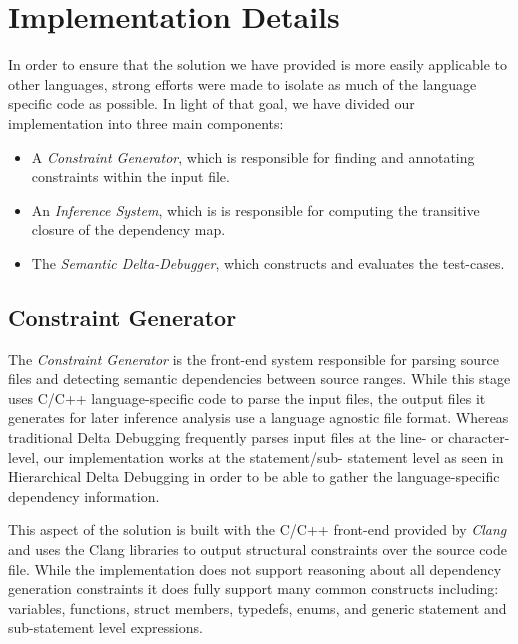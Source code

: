 \documentclass[preprint]{acm_proc_article-sp}
\begin{document}

\section{Implementation Details}

In order to ensure that the solution we have provided is more easily applicable
to other languages, strong efforts were made to isolate as much of the language
specific code as possible. In light of that goal, we have divided our
implementation into three main components:

\begin{itemize}
\item A \emph{Constraint Generator}, which is responsible for finding and
      annotating constraints within the input file.
\item An \emph{Inference System}, which is is responsible for
      computing the transitive closure of the dependency map.
\item The \emph{Semantic Delta-Debugger}, which constructs and evaluates the
      test-cases.
\end{itemize}

\subsection{Constraint Generator}

The \emph{Constraint Generator} is the front-end system responsible for parsing
source files and detecting semantic dependencies between source ranges. While
this stage uses C/C++ language-specific code to parse the input files, the
output files it generates for later inference analysis use a language agnostic
file format. Whereas traditional Delta Debugging frequently parses input files
at the line- or character-level, our implementation works at the statement/sub-
statement level as seen in Hierarchical Delta Debugging \citep{hdd} in order to
be able to gather the language-specific dependency information.

This aspect of the solution is built with the C/C++ front-end provided by
\emph{Clang} \citep{clang} and uses the Clang libraries to output structural
constraints over the source code file. While the implementation does not support
reasoning about all dependency generation constraints it does fully support many
common constructs including: variables, functions, struct members, typedefs,
enums, and generic statement and sub-statement level expressions.
\end{document}
